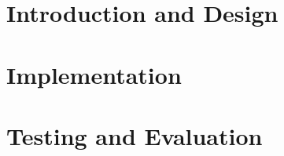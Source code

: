 



\makeatletter{}\makeatother%

\pagestyle{empty} %

\cleardoublepage

\cleardoublepage
{}
\setcounter{tocdepth}{2}
\tableofcontents
\listoftodos

\cleardoublepage

\part{Introduction and Design}


\part{Implementation}

\part{Testing and Evaluation}




\newpage
\appendix


